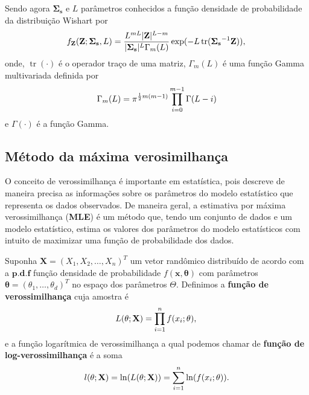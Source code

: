 \documentclass[conference]{IEEEtran}
\DeclareMathOperator{\traco}{tr}
\begin{document}
Sendo agora $\mathbf{\Sigma_{s}}$ e $L$ parâmetros conhecidos a função densidade de probabilidade da distribuição Wishart por  
%
\begin{equation}
    f_{\mathbf{Z}}(\mathbf{Z};\mathbf{\Sigma_{s}},L)=\frac{L^{mL}|\mathbf{Z}|^{L-m}}{|\mathbf{\Sigma_{s}}|^{L}\Gamma_m(L)} \exp(-L\traco(\mathbf{\Sigma_{s}}^{-1}\mathbf{Z})), \\
\end{equation}
onde, $\traco(\cdot)$ é o operador traço de uma matriz, $\Gamma_m(L)$ é uma função Gamma multivariada definida por
\begin{equation}
	\Gamma_m(L)=\pi^{\frac{1}{2}m(m-1)} \prod_{i=0}^{m-1}\Gamma(L-i) \\
\end{equation}
e $\Gamma(\cdot)$ é a função Gamma.

\subsection{Método da máxima verosimilhança}

O conceito de verossimilhança é importante em estatística, pois descreve de maneira precisa as informações sobre os parâmetros do modelo estatístico que representa os dados observados. De maneira geral, a estimativa por máxima verossimilhança (\textbf{MLE}) é um método que, tendo um conjunto de dados e um modelo estatístico, estima os valores dos parâmetros do modelo estatísticos com intuito de maximizar uma função de probabilidade dos dados. 

Suponha $\mathbf{X}=(X_1,X_2,\dots,X_n)^T$ um vetor randômico distribuído de acordo com a $\mathbf{p.d.f}$ função densidade de probabilidade $f(\mathbf{x},\mathbf{\theta})$ com parâmetros $\mathbf{\theta}=(\theta_1,\dots,\theta_d)^T$ no espaço dos parâmetros $\Theta$. Definimos  a \textbf{função de verossimilhança} cuja amostra é 
\begin{equation}
    L(\theta;\mathbf{X}) = \prod_{i=1}^{n}f(x_i;\theta), \\
\end{equation}
e a função logarítmica de verossimilhança a qual podemos chamar de  \textbf{função de log-verossimilhança} é a soma
\begin{equation}
	l(\theta;\mathbf{X})= \ln(L(\theta;\mathbf{X})) = \sum_{i=1}^{n}\ln(f(x_i;\theta)). \\
\end{equation}
\end{document}
